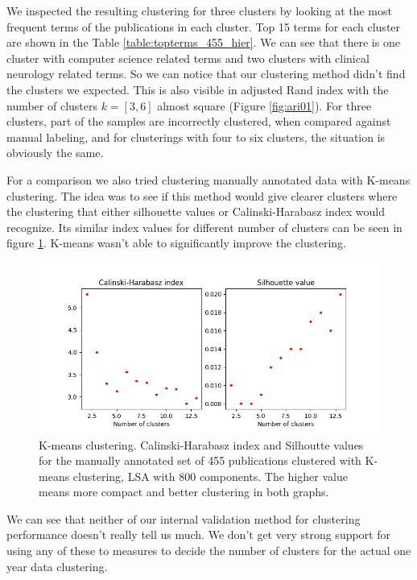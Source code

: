 We inspected the resulting clustering for three clusters by 
looking at the most frequent terms of the publications in each 
cluster. Top 15 terms for each cluster are shown in the Table 
\ref{table:topterms_455_hier}. We can see that there is one cluster
with computer science related terms and two clusters with clinical
neurology related terms. So we can notice that our clustering method
didn't find the clusters we expected. This is also visible in 
adjusted Rand index with the number of clusters $k=[3,6]$ almost 
square (Figure \ref{fig:ari01}). For three clusters, part of the 
samples are incorrectly clustered, when compared against manual
labeling, and for clusterings with four to six clusters, the 
situation is obviously the same.



For a comparison we also tried clustering manually annotated data
with K-means clustering. The idea was to see if this method would
give clearer clusters where the clustering that either silhouette values or 
Calinski-Harabasz index would recognize. Its similar
index values for different number of clusters can be seen in 
figure \ref{fig:ch-silh02}. K-means wasn't able to significantly 
improve the clustering.

\begin{figure}[htp]
  \begin{center}    
\includegraphics[width=11.5cm]{images/c-h-silh-index-plot-455-2_12-800-kmeans.png}
    \caption{K-means clustering. Calinski-Harabasz index and Silhoutte values for the
    manually annotated set of 455 publications clustered with K-means 
    clustering, LSA with 800 components. The higher value means
    more compact and better clustering in both graphs.}
    \label{fig:ch-silh02}
  \end{center}
\end{figure}

We can see that neither of our internal validation method for 
clustering performance doesn't really tell us much. 
We don't get very strong support for using any of these to measures
to decide the number of clusters for the actual one year data 
clustering.


